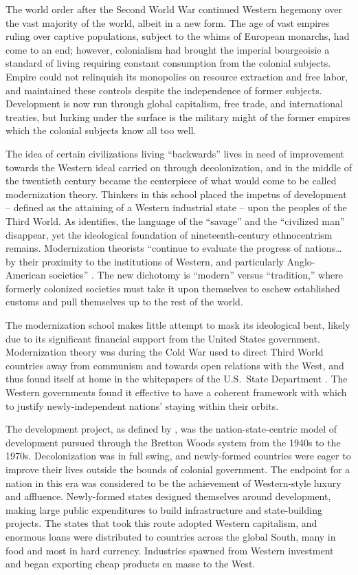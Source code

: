 \documentclass{../../../coursework}
\begin{document}
The world order after the Second World War continued Western hegemony over the
vast majority of the world, albeit in a new form. The age of vast empires
ruling over captive populations, subject to the whims of European monarchs,
had come to an end; however, colonialism had brought the imperial bourgeoisie
a standard of living requiring constant consumption from the colonial
subjects. Empire could not relinquish its monopolies on resource extraction
and free labor, and maintained these controls despite the independence of
former subjects. Development is now run through global capitalism, free trade,
and international treaties, but lurking under the surface is the military
might of the former empires which the colonial subjects know all too well.

The idea of certain civilizations living ``backwards'' lives in need of
improvement towards the Western ideal carried on through decolonization, and
in the middle of the twentieth century became the centerpiece of what would
come to be called modernization theory. Thinkers in this school placed the
impetus of development -- defined as the attaining of a Western industrial
state -- upon the peoples of the Third World. As \textcite{Tipps1973}
identifies, the language of the ``savage'' and the ``civilized man''
disappear, yet the ideological foundation of nineteenth-century ethnocentrism
remains. Modernization theorists ``continue to evaluate the progress of
nations… by their proximity to the institutions of Western, and particularly
Anglo-American societies'' \parencite[206]{Tipps1973}. The new dichotomy is
``modern'' versus ``tradition,'' where formerly colonized societies must take
it upon themselves to eschew established customs and pull themselves up to the
rest of the world.

The modernization school makes little attempt to mask its ideological bent,
likely due to its significant financial support from the United States
government. Modernization theory was during the Cold War used to direct Third
World countries away from communism and towards open relations with the West,
and thus found itself at home in the whitepapers of the U.S.\ State Department
\parencite{So1990}. The Western governments found it effective to have a
coherent framework with which to justify newly-independent nations' staying
within their orbits.

The development project, as defined by \textcite{McMichael2004}, was the
nation-state-centric model of development pursued through the Bretton Woods
system from the 1940s to the 1970s. Decolonization was in full swing, and
newly-formed countries were eager to improve their lives outside the bounds of
colonial government. The endpoint for a nation in this era was considered to
be the achievement of Western-style luxury and affluence. Newly-formed states
designed themselves around development, making large public expenditures to
build infrastructure and state-building projects. The states that took this
route adopted Western capitalism, and enormous loans were distributed to
countries across the global South, many in food and most in hard currency.
Industries spawned from Western investment and began exporting cheap products
en masse to the West.
\end{document}

